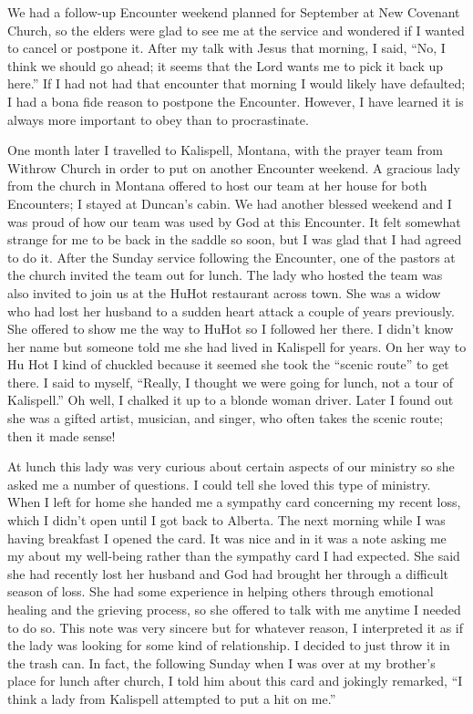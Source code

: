 \documentclass[oneside]{book}
\begin{document}
We had a follow-up Encounter weekend planned for September at New Covenant Church, so the elders were glad to see me at the service and wondered if I wanted to cancel or postpone it. After my talk with Jesus that morning, I said, “No, I think we should go ahead; it seems that the Lord wants me to pick it back up here.” If I had not had that encounter that morning I would likely have defaulted; I had a bona fide reason to postpone the Encounter. However, I have learned it is always more important to obey than to procrastinate. 

One month later I travelled to Kalispell, Montana, with the prayer team from Withrow Church in order to put on another Encounter weekend. A gracious lady from the church in Montana offered to host our team at her house for both Encounters; I stayed at Duncan’s cabin. We had another blessed weekend and I was proud of how our team was used by God at this Encounter. It felt somewhat strange for me to be back in the saddle so soon, but I was glad that I had agreed to do it. After the Sunday service following the Encounter, one of the pastors at the church invited the team out for lunch. The lady who hosted the team was also invited to join us at the HuHot restaurant across town. She was a widow who had lost her husband to a sudden heart attack a couple of years previously. She offered to show me the way to HuHot so I followed her there. I didn’t know her name but someone told me she had lived in Kalispell for years. On her way to Hu Hot I kind of chuckled because it seemed she took the “scenic route” to get there. I said to myself, “Really, I thought we were going for lunch, not a tour of Kalispell.” Oh well, I chalked it up to a blonde woman driver. Later I found out she was a gifted artist, musician, and singer, who often takes the scenic route; then it made sense! 

At lunch this lady was very curious about certain aspects of our ministry so she asked me a number of questions. I could tell she loved this type of ministry. When I left for home she handed me a sympathy card concerning my recent loss, which I didn’t open until I got back to Alberta. The next morning while I was having breakfast I opened the card. It was nice and in it was a note asking me my about my well-being rather than the sympathy card I had expected. She said she had recently lost her husband and God had brought her through a difficult season of loss. She had some experience in helping others through emotional healing and the grieving process, so she offered to talk with me anytime I needed to do so. This note was very sincere but for whatever reason, I interpreted it as if the lady was looking for some kind of relationship. I decided to just throw it in the trash can. In fact, the following Sunday when I was over at my brother’s place for lunch after church, I told him about this card and jokingly remarked, “I think a lady from Kalispell attempted to put a hit on me.” 
\end{document}

